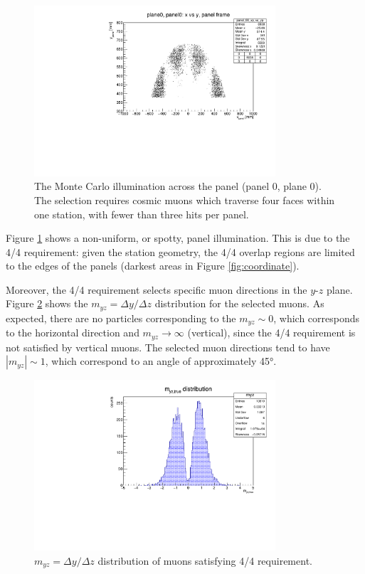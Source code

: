 \begin{figure}[!h]
    \centering
    \includegraphics[width =0.8\textwidth]{figures/pdf/xp_vs_yp_panel0.pdf}
    \caption[Monte Carlo illumination across 
    the panel (panel 0, plane 0).]{
        The Monte Carlo illumination 
        across the panel (panel 0, plane 0).
        The selection requires cosmic muons which 
        traverse four faces within one station, with 
        fewer than three hits per panel.}
    \label{fig:illumination}
\end{figure}
Figure \ref{fig:illumination} shows a 
non-uniform, or spotty, 
panel illumination. This is due to the 4/4 requirement: 
given the station geometry, the 4/4 overlap 
regions are 
limited to the edges of the panels (darkest 
areas in Figure \ref{fig:coordinate}). 

Moreover, the 4/4 requirement selects specific
muon directions in the $y$-$z$ plane. 
Figure \ref{fig:myz} shows the 
$m_{yz}=\Delta y /\Delta z$ distribution 
for the selected muons. 
As expected, there are no particles corresponding 
to the $m_{yz}\sim 0$, which corresponds to the  
horizontal direction and 
$m_{yz} \rightarrow \infty$ (vertical), since the 
4/4 requirement is not satisfied by vertical muons. 
The selected muon  
directions tend to have  
$|m_{yz}| \sim 1$, which correspond to  
an angle of approximately 45°.
\begin{figure}[!h]
    \centering
    \includegraphics[width =0.8\textwidth]{figures/pdf/myz.pdf}
    \caption[The $y-z$ direction 
    distribution of muons satisfying 4/4 requirement.]{
        $m_{yz}=\Delta y /\Delta z$  
    distribution of muons satisfying 4/4 requirement.}
    \label{fig:myz}
\end{figure}

